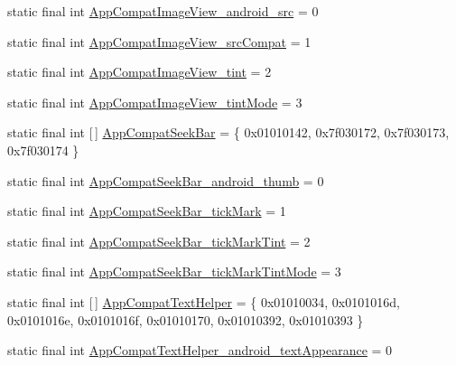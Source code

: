 \begin{DoxyCompactItemize}
static final int \mbox{\hyperlink{classandroid_1_1support_1_1v7_1_1appcompat_1_1R_1_1styleable_af57205141e7c21bbfa3d98e2683ba0f7}{App\+Compat\+Image\+View\+\_\+android\+\_\+src}} = 0
\item 
static final int \mbox{\hyperlink{classandroid_1_1support_1_1v7_1_1appcompat_1_1R_1_1styleable_a693c5ce1bfc86d7bc8b9230f077dbdef}{App\+Compat\+Image\+View\+\_\+src\+Compat}} = 1
\item 
static final int \mbox{\hyperlink{classandroid_1_1support_1_1v7_1_1appcompat_1_1R_1_1styleable_a082d0b8ae5605410aeb02f596febc5d6}{App\+Compat\+Image\+View\+\_\+tint}} = 2
\item 
static final int \mbox{\hyperlink{classandroid_1_1support_1_1v7_1_1appcompat_1_1R_1_1styleable_a4b31942e5e43356689e7e951bf9c5b5f}{App\+Compat\+Image\+View\+\_\+tint\+Mode}} = 3
\item 
static final int \mbox{[}$\,$\mbox{]} \mbox{\hyperlink{classandroid_1_1support_1_1v7_1_1appcompat_1_1R_1_1styleable_a01eb64f8495e48b568515c8de894e9cf}{App\+Compat\+Seek\+Bar}} = \{ 0x01010142, 0x7f030172, 0x7f030173, 0x7f030174 \}
\item 
static final int \mbox{\hyperlink{classandroid_1_1support_1_1v7_1_1appcompat_1_1R_1_1styleable_a811adb8cdc1a83787b5d65eb3afcfb19}{App\+Compat\+Seek\+Bar\+\_\+android\+\_\+thumb}} = 0
\item 
static final int \mbox{\hyperlink{classandroid_1_1support_1_1v7_1_1appcompat_1_1R_1_1styleable_a5181cde4b228163e06a04917c76db41b}{App\+Compat\+Seek\+Bar\+\_\+tick\+Mark}} = 1
\item 
static final int \mbox{\hyperlink{classandroid_1_1support_1_1v7_1_1appcompat_1_1R_1_1styleable_a03ada21ed17781a049c6712d9d9a5ce8}{App\+Compat\+Seek\+Bar\+\_\+tick\+Mark\+Tint}} = 2
\item 
static final int \mbox{\hyperlink{classandroid_1_1support_1_1v7_1_1appcompat_1_1R_1_1styleable_a5d540bd0e84c530cc7d37387f117baca}{App\+Compat\+Seek\+Bar\+\_\+tick\+Mark\+Tint\+Mode}} = 3
\item 
static final int \mbox{[}$\,$\mbox{]} \mbox{\hyperlink{classandroid_1_1support_1_1v7_1_1appcompat_1_1R_1_1styleable_acd548363be77a276a3dd215719409539}{App\+Compat\+Text\+Helper}} = \{ 0x01010034, 0x0101016d, 0x0101016e, 0x0101016f, 0x01010170, 0x01010392, 0x01010393 \}
\item 
static final int \mbox{\hyperlink{classandroid_1_1support_1_1v7_1_1appcompat_1_1R_1_1styleable_a814e95f4f2dd374d2a695e80970efd8f}{App\+Compat\+Text\+Helper\+\_\+android\+\_\+text\+Appearance}} = 0

\end{DoxyCompactItemize}
